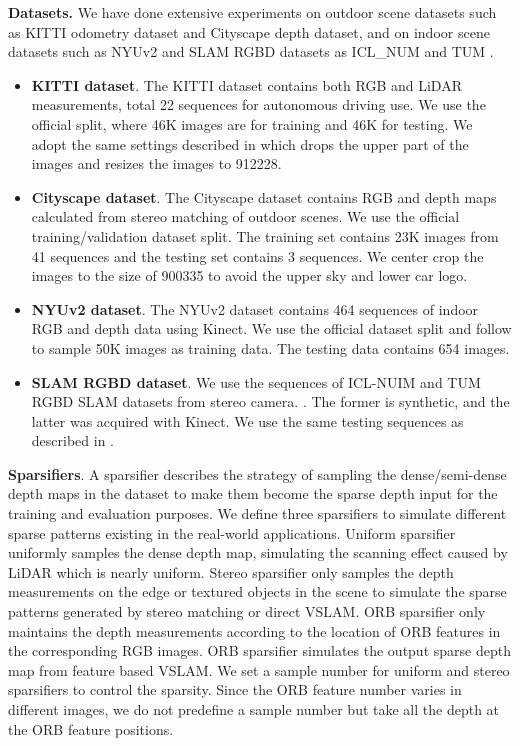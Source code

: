 \documentclass{article}
\begin{document}
\textbf{Datasets.} We have done extensive experiments on outdoor scene datasets such as KITTI odometry dataset \cite{geiger2012we} and Cityscape depth dataset\cite{cordts2016cityscapes},
 and on indoor scene datasets such as NYUv2 \cite{silberman2012indoor} and SLAM RGBD datasets as ICL\_NUM \cite{handa2014benchmark} and TUM \cite{sturm2012benchmark}.
 
\begin{itemize}
\item\textbf{KITTI dataset}. The KITTI dataset contains both RGB and LiDAR measurements, total 22 sequences for autonomous driving use. We use the official split, where 46K images are for training and 46K for testing. We adopt the same settings described in \cite{Ma2017SparseToDense,cheng2018learning} which drops the upper part of the images and resizes the images to 912228.
\item\textbf{Cityscape dataset}. The Cityscape dataset contains RGB and depth maps calculated from stereo matching of outdoor scenes. We use the official training/validation dataset split. The training set contains 23K images from 41 sequences and the testing set contains 3 sequences. We center crop the images to the size of 900335 to avoid the upper sky and lower car logo. 
\item\textbf{NYUv2 dataset}. The NYUv2 dataset contains 464 sequences of indoor RGB and depth data using Kinect. We use the official dataset split and follow \cite{Ma2017SparseToDense} to sample 50K images as training data. The testing data contains 654 images.
\item\textbf{SLAM RGBD dataset}. We use the sequences of ICL-NUIM\cite{handa:etal:ICRA2014} and TUM RGBD SLAM datasets from stereo camera. \cite{sturm2012benchmark}. The former is synthetic, and the latter was acquired with Kinect. We use the same testing sequences as described in \cite{tateno2017cnn}.
\end{itemize}

\textbf{Sparsifiers}. A sparsifier describes the strategy of sampling the dense/semi-dense depth maps in the dataset to make them become the sparse depth input for the training and evaluation purposes. We define three sparsifiers to simulate different sparse patterns existing in the real-world applications. Uniform sparsifier uniformly samples the dense depth map, simulating the scanning effect caused by LiDAR which is nearly uniform. Stereo sparsifier only samples the depth measurements on the edge or textured objects in the scene to simulate the sparse patterns generated by stereo matching or direct VSLAM. ORB sparsifier only maintains the depth measurements according to the location of ORB features in the corresponding RGB images. ORB sparsifier simulates the output sparse depth map from feature based VSLAM. We set a sample number for uniform and stereo sparsifiers to control the sparsity. Since the ORB feature number varies in different images, we do not predefine a sample number but take all the depth at the ORB feature positions. 
\end{document}
